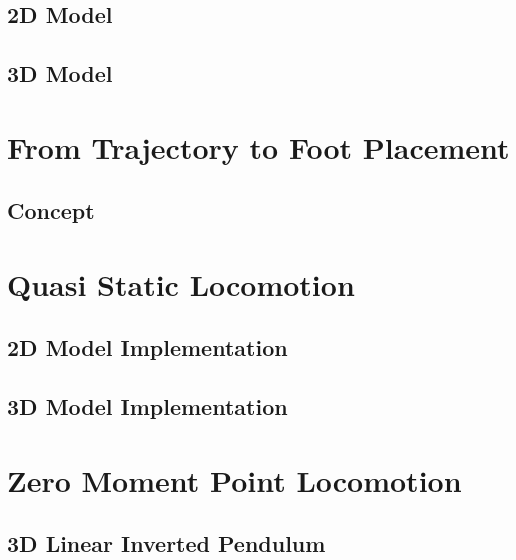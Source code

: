 \documentclass{UoNMCHA}
\begin{document}
		\subsection{2D Model}
			
		\subsection{3D Model}
			
	
	\clearpage	
	\newpage\section{From Trajectory to Foot Placement}\label{sec:NovelTraj}
		
		\subsection{Concept}
			
	
	\clearpage
	\newpage\section{Quasi Static Locomotion}\label{sec:Quasi Static Locomotion}
		
		\subsection{2D Model Implementation}\label{sec:2D_QS}
			
		\subsection{3D Model Implementation}\label{sec:3D_QS}
			
			
	\clearpage
	\newpage\section{Zero Moment Point Locomotion}\label{sec:Zero Moment Point Locomotion}
		
		\subsection{3D Linear Inverted Pendulum}
			
\end{document}
